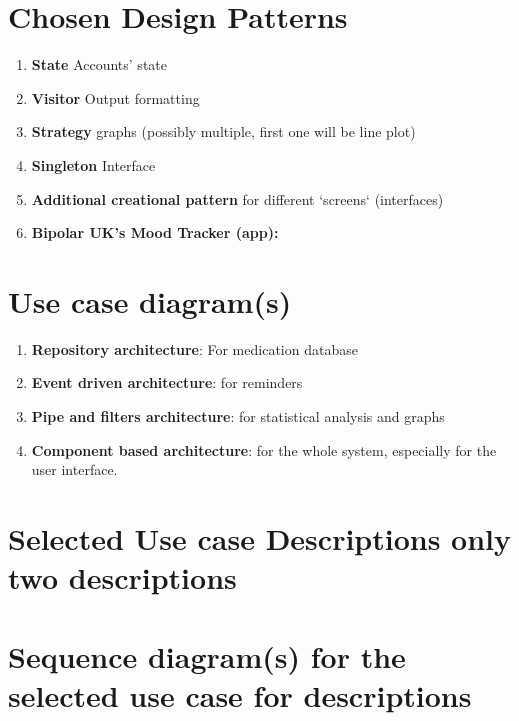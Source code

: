 \documentclass[11pt]{article}
\begin{document}
    \section{Chosen Design Patterns}\label{sec:chosen-design-patterns}

    \begin{enumerate}
        \item \textbf{State} Accounts' state\cite{RefactoringGuru}
        \item \textbf{Visitor} Output formatting\cite{RefactoringGuru}
        \item \textbf{Strategy} graphs (possibly multiple, first one will be line plot)\cite{RefactoringGuru} %
        \item \textbf{Singleton} Interface\cite{RefactoringGuru}
        \item \textbf{Additional creational pattern} for different `screens` (interfaces)\cite{RefactoringGuru}
        \item \textbf{Bipolar UK’s Mood Tracker (app):} \cite{BiPolUK}
    \end{enumerate}


    \section{Use case diagram(s)}\label{sec:use-case-diagram(s)}

    \begin{enumerate}
        \item \textbf{Repository architecture}: For medication database
        \item \textbf{Event driven architecture}: for reminders
        \item \textbf{Pipe and filters architecture}: for statistical analysis and graphs
        \item \textbf{Component based architecture}: for the whole system, especially for the user interface.
    \end{enumerate}


    \section{Selected Use case Descriptions {only two descriptions}}\label{sec:selected-use-case-descriptions}


    \section{Sequence diagram(s) {for the selected use case for descriptions}}\label{sec:sequence-diagram(s)}
\end{document}
